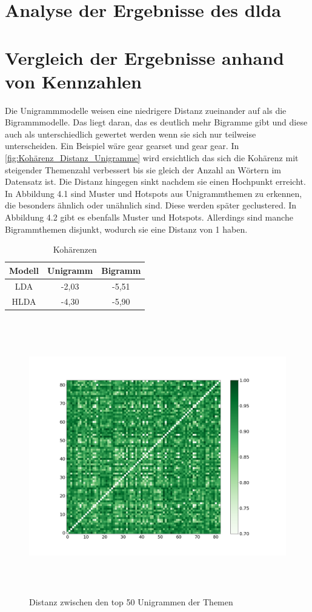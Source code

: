 \section{Analyse der Ergebnisse des \gls{dlda}}


\section{Vergleich der Ergebnisse anhand von Kennzahlen}
Die Unigrammmodelle weisen eine niedrigere Distanz zueinander auf als die Bigrammmodelle. Das liegt daran, das es deutlich mehr Bigramme gibt und diese auch als unterschiedlich gewertet werden wenn sie sich nur teilweise unterscheiden. Ein Beispiel wäre gear gearset und gear gear. In \ref{fig:Kohärenz_Distanz_Unigramme} wird ersichtlich das sich die Kohärenz mit steigender Themenzahl verbessert bis sie gleich der Anzahl an Wörtern im Datensatz ist. Die Distanz hingegen sinkt nachdem sie einen Hochpunkt erreicht. In Abbildung 4.1 sind Muster und Hotspots aus Unigrammthemen zu erkennen, die besonders ähnlich oder unähnlich sind. Diese werden später geclustered. In Abbildung 4.2 gibt es ebenfalls Muster und Hotspots. Allerdings sind manche Bigrammthemen disjunkt, wodurch sie eine Distanz von 1 haben. 

\begin{table}
	\RawFloats
	\centering
	\caption{Kohärenzen}
	\begin{tabular}{|c|c|c|}
		\hline
		Modell & Unigramm & Bigramm \\
		\hline
		LDA & -2,03 & -5,51 \\
		\hline
		HLDA & -4,30 & -5,90 \\
		\hline
	\end{tabular}
	\label{table:Kohärenzen}
\end{table} 

\begin{figure}[htpb]
	\centering
	\includegraphics[width=\textwidth,height=12cm,keepaspectratio=true]{img/unigram_jaccard_50_green_07.png}
	\caption{
		Distanz zwischen den top 50 Unigrammen der Themen
	}
	\label{fig:Distanz_Unigramme}
\end{figure}

